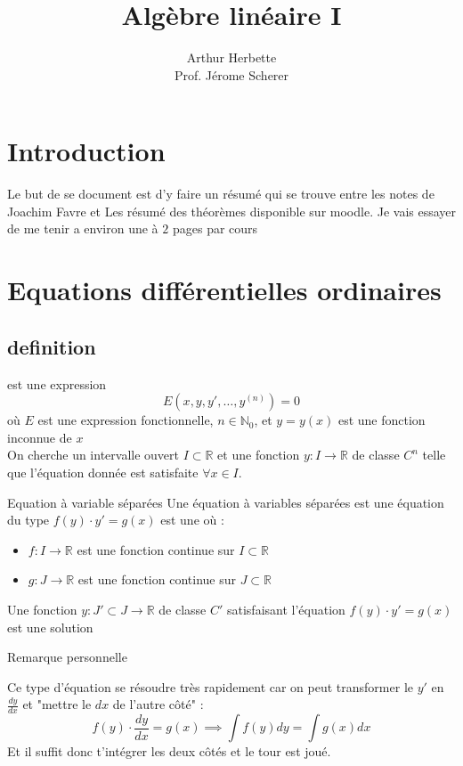 \documentclass[11pt]{book}
\title{Algèbre linéaire I}
\author{Arthur Herbette \\
Prof. Jérome Scherer}
\begin{document}
\setcounter{section}{8}
\maketitle

\chapter{Introduction}
Le but de se document est d'y faire un résumé qui se trouve entre les notes de Joachim Favre et Les résumé des théorèmes disponible sur moodle. Je vais essayer de me tenir a environ une à $2$ pages par cours

\chapter{Equations différentielles ordinaires}
\section{definition} 
\begin{definition}
     est une expression \[E(x, y, y', \dots, y^{(n)}) = 0 \]
    où $E$ est une expression fonctionnelle, $n \in \mathbb{N}_0$, et $y = y (x)$ est une fonction inconnue de $x$ \\
    On cherche un intervalle ouvert $I \subset \mathbb{R}$ et une fonction $y : I \to \mathbb{R}$ de classe $C^n$ telle que l'équation donnée est satisfaite $\forall x \in I$.
\end{definition}
\begin{parag}{Equation à variable séparées} 
 Une équation à variables séparées est une équation du type $f(y)\cdot y' = g(x)$ est une  où : 
 \begin{itemize}
     \item $f: I \to \mathbb{R}$ est une fonction continue sur $I \subset \mathbb{R}$
     \item $g: J \to \mathbb{R}$ est une fonction continue sur $J \subset \mathbb{R}$
 \end{itemize}
 Une fonction $y: J' \subset J \to \mathbb{R}$ de classe $C'$ satisfaisant l'équation $f(y)\cdot y' = g(x)$ est une solution
 \begin{subparag}{Remarque personnelle}
     \begin{framedremark}
         Ce type d'équation se résoudre très rapidement car on peut transformer le $y'$ en $\frac{dy}{dx}$ et "mettre le $dx$ de l'autre côté" : 
         \[f(y)\cdot\frac{dy}{dx} = g(x) \implies \int f(y)dy = \int g(x) dx\] 
         Et il suffit donc t'intégrer les deux côtés et le tour est joué.
     \end{framedremark}
 \end{subparag}
\end{parag}
\end{document}
